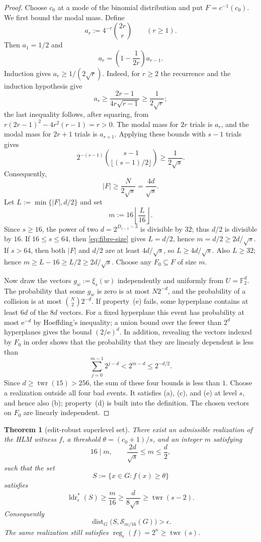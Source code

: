 \documentclass[10pt,a4paper]{amsart}
\newtheorem{theorem}{Theorem}
\numberwithin{theorem}{section}
\newcommand{\F}{\mathbb{F}}
\newcommand{\abs}[1]{\lvert #1\rvert}
\newcommand{\twr}{\operatorname{twr}}
\newcommand{\ldrs}{\operatorname{ldr}^{*}}
\newcommand{\reg}{\operatorname{reg}}
\newcommand{\Stable}{\mathcal{S}}
\newcommand{\econst}{\mathrm e}
\begin{document}
\begin{proof}
Choose $c_0$ at a mode of the binomial distribution and put
$F=c^{-1}(c_0)$.  We first bound the modal mass.  Define
\[
  a_r:=4^{-r}\binom{2r}{r}\qquad(r\ge1).
\]
Then $a_1=1/2$ and
\[
  a_r=\left(1-\frac1{2r}\right)a_{r-1}.
\]
Induction gives $a_r\ge1/(2\sqrt r)$.  Indeed, for $r\ge2$ the recurrence
and the induction hypothesis give
\[
  a_r\ge\frac{2r-1}{4r\sqrt{r-1}}\ge\frac1{2\sqrt r};
\]
the last inequality follows, after squaring, from
$r(2r-1)^2-4r^2(r-1)=r>0$.  The modal mass for $2r$ trials is $a_r$, and the
modal mass for $2r+1$ trials is $a_{r+1}$.  Applying these bounds with
$s-1$ trials gives
\[
  2^{-(s-1)}\binom{s-1}{\lfloor(s-1)/2\rfloor}
  \ge\frac1{2\sqrt{s}}.
\]
Consequently,
\begin{equation}\label{eq:fibre-size}
  \abs F\ge\frac{N}{2\sqrt{s}}=\frac{4d}{\sqrt{s}}.
\end{equation}
Let $L:=\min\{\abs F,d/2\}$ and set
\[
  m:=16\left\lfloor\frac{L}{16}\right\rfloor.
\]
Since $s\ge16$, the power of two $d=2^{D_{s-1}-3}$ is divisible by $32$;
thus $d/2$ is divisible by $16$.  If $16\le s\le64$, then \eqref{eq:fibre-size} gives $L=d/2$, hence
$m=d/2\ge2d/\sqrt{s}$.  If $s>64$, then both $\abs F$ and $d/2$ are at
least $4d/\sqrt{s}$, so $L\ge4d/\sqrt{s}$.  Also $L\ge32$; hence
$m\ge L-16\ge L/2\ge2d/\sqrt{s}$.  Choose any
$F_0\subseteq F$ of size $m$.

Now draw the vectors $g_w:=\xi_s(w)$ independently and uniformly from
$U=\F_2^d$.  The probability that some $g_w$ is zero is at most $N2^{-d}$, and the
probability of a collision is at most $\binom{N}{2}2^{-d}$.  If
property~\textup{(e)} fails, some hyperplane contains at least $6d$ of the
$8d$ vectors.  For a fixed hyperplane this event has probability at most
$\econst^{-d}$ by Hoeffding's inequality; a union bound over the fewer than
$2^d$ hyperplanes gives the bound $(2/\econst)^d$.  In addition, revealing the vectors indexed by
$F_0$ in order shows that the probability that they are linearly dependent is
less than
\[
  \sum_{j=0}^{m-1}2^{j-d}<2^{m-d}\le2^{-d/2}.
\]
Since $d\ge\twr(15)>256$, the sum of these four bounds is less than $1$.
Choose a realization outside all four bad events.  It satisfies
\textup{(a)}, \textup{(c)}, and \textup{(e)} at level $s$, and hence also
\textup{(b)}; property~\textup{(d)} is built into the definition.  The
chosen vectors on $F_0$ are linearly independent.
\end{proof}


\begin{theorem}[edit-robust superlevel set]\label{thm:witness}
There exist an admissible realization of the HLM witness $f$, a threshold
$\theta=(c_0+1)/s$, and an integer $m$ satisfying
\[
  16\mid m,\qquad \frac{2d}{\sqrt{s}}\le m\le\frac d2,
\]
such that the set
\[
  S:=\{x\in G:f(x)\ge\theta\}
\]
satisfies
\[
  \ldrs_\epsilon(S)\ge\frac{m}{16}
  \ge\frac{d}{8\sqrt{s}}
  \ge\twr(s-2).
\]
Consequently
\[
  \operatorname{dist}_G\bigl(S,\Stable_{m/16}(G)\bigr)>\epsilon.
\]
The same realization still satisfies
$\reg_\epsilon(f)=2^n\ge\twr(s)$.
\end{theorem}
\end{document}
